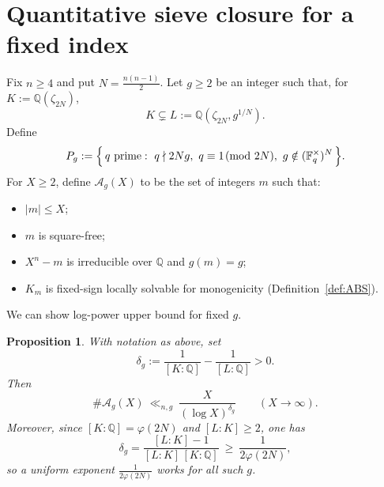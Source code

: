 \documentclass[11pt,letterpaper]{amsart}
\newcommand{\Q}{\mathbb{Q}}
\newcommand{\F}{\mathbb{F}}
\theoremstyle{plain}
\newtheorem{proposition}[theorem]{Proposition}
\theoremstyle{definition}
\theoremstyle{remark}
\theoremstyle{plain}
\begin{document}
\section{Quantitative sieve closure for a fixed index}
\label{sec:quantitative-sieve}

Fix $n\ge 4$ and put $N=\frac{n(n-1)}2$.
Let $g\ge 2$ be an integer such that, for $K:=\Q(\zeta_{2N})$,
\[
K\subsetneq L:=\Q(\zeta_{2N},g^{1/N}).
\]
Define
\[
P_g:=\Bigl\{\,q\ \text{prime}:\ q\nmid 2Ng,\ q\equiv 1\!\!\pmod{2N},\ g\notin(\F_q^\times)^N\,\Bigr\}.
\]
For $X\ge 2$, define $\mathcal A_g(X)$ to be the set of integers $m$ such that:
\begin{itemize}[leftmargin=*]
\item $|m|\le X$;
\item $m$ is square-free;
\item $X^n-m$ is irreducible over $\Q$ and $g(m)=g$;
\item $K_m$ is fixed-sign locally solvable for monogenicity (Definition~\ref{def:ABS}).
\end{itemize}

We can show log-power upper bound for fixed $g$.
\begin{proposition}
\label{prop:logpower-fixed-g}
With notation as above, set
\[
\delta_g:=\frac{1}{[K:\Q]}-\frac{1}{[L:\Q]}>0.
\]
Then
\[
\#\mathcal A_g(X)\ \ll_{n,g}\ \frac{X}{(\log X)^{\delta_g}}
\qquad (X\to\infty).
\]
Moreover, since $[K:\Q]=\varphi(2N)$ and $[L:K]\ge 2$, one has
\[
\delta_g=\frac{[L:K]-1}{[L:K]\,[K:\Q]}\ \ge\ \frac{1}{2\varphi(2N)},
\]
so a uniform exponent $\frac{1}{2\varphi(2N)}$ works for all such $g$.
\end{proposition}
\end{document}
